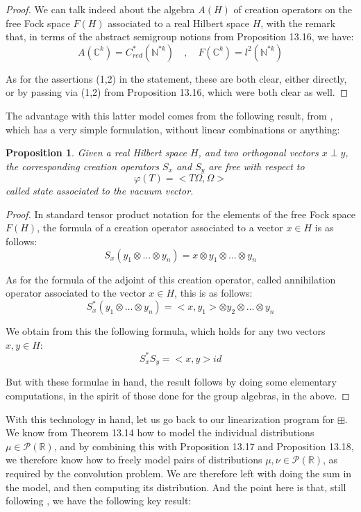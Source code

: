 \documentclass[12pt]{amsbook}
\newtheorem{proposition}[theorem]{Proposition}
\begin{document}
\begin{proof}
We can talk indeed about the algebra $A(H)$ of creation operators on the free Fock space $F(H)$ associated to a real Hilbert space $H$, with the remark that, in terms of the abstract semigroup notions from Proposition 13.16, we have:
$$A(\mathbb C^k)=C^*_{red}(\mathbb N^{*k})\quad,\quad 
F(\mathbb C^k)=l^2(\mathbb N^{*k})$$

As for the assertions (1,2) in the statement, these are both clear, either directly, or by passing via (1,2) from Proposition 13.16, which were both clear as well.
\end{proof}

The advantage with this latter model comes from the following result, from \cite{vo1}, which has a very simple formulation, without linear combinations or anything:


\begin{proposition}
Given a real Hilbert space $H$, and two orthogonal vectors $x\perp y$, the corresponding creation operators $S_x$ and $S_y$ are free with respect to
$$\varphi(T)=<T\Omega,\Omega>$$
called state associated to the vacuum vector.
\end{proposition}

\begin{proof}
In standard tensor product notation for the elements of the free Fock space $F(H)$, the formula of a creation operator associated to a vector $x\in H$ is as follows:
$$S_x(y_1\otimes\ldots\otimes y_n)=x\otimes y_1\otimes\ldots\otimes y_n$$

As for the formula of the adjoint of this creation operator, called annihilation operator associated to the vector $x\in H$, this is as follows: 
$$S_x^*(y_1\otimes\ldots\otimes y_n)=<x,y_1>\otimes y_2\otimes\ldots\otimes y_n$$

We obtain from this the following formula, which holds for any two vectors $x,y\in H$:
$$S_x^*S_y=<x,y>id$$

But with these formulae in hand, the result follows by doing some elementary computations, in the spirit of those done for the group algebras, in the above.
\end{proof}

With this technology in hand, let us go back to our linearization program for $\boxplus$. We know from Theorem 13.14 how to model the individual distributions $\mu\in\mathcal P(\mathbb R)$, and by combining this with Proposition 13.17 and Proposition 13.18, we therefore know how to freely model pairs of distributions $\mu,\nu\in\mathcal P(\mathbb R)$, as required by the convolution problem. We are therefore left with doing the sum in the model, and then computing its distribution. And the point here is that, still following \cite{vo1}, we have the following key result:
\end{document}
